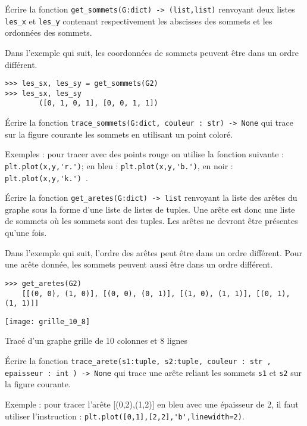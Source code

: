 \begin{question}Écrire la fonction \lstinline{get_sommets(G:dict) -> (list,list)} renvoyant deux listes \lstinline{les_x} et \lstinline{les_y} contenant respectivement les abscisses des sommets et les ordonnées des sommets.
\end{question}


\begin{exemple}
Dans l'exemple qui suit, les coordonnées de sommets peuvent être dans un ordre différent. 
\begin{lstlisting}
>>> les_sx, les_sy = get_sommets(G2)
>>> les_sx, les_sy
        ([0, 1, 0, 1], [0, 0, 1, 1])
\end{lstlisting}
\end{exemple}


\begin{question}
Écrire la fonction \lstinline{trace_sommets(G:dict, couleur : str) -> None} qui trace sur la figure courante les sommets en utilisant un point coloré.

Exemples : pour tracer avec des points rouge on utilise la fonction suivante : \lstinline{plt.plot(x,y,'r.')};  en bleu : \lstinline{plt.plot(x,y,'b.')}, en noir : \lstinline{plt.plot(x,y,'k.') }.
\end{question}

\begin{question}
Écrire la fonction \lstinline{get_aretes(G:dict) -> list} renvoyant la liste des arêtes du graphe sous la forme d'une liste de listes de tuples. Une arête est donc une liste de sommets où les sommets sont des tuples. Les arêtes ne devront être présentes qu'une fois.
\end{question}

\begin{exemple}
Dans l'exemple qui suit, l'ordre des arêtes peut être dans un ordre différent. Pour une arête donnée, les sommets peuvent aussi être dans un ordre différent.
\begin{lstlisting}
>>> get_aretes(G2)
	[[(0, 0), (1, 0)], [(0, 0), (0, 1)], [(1, 0), (1, 1)], [(0, 1), (1, 1)]]
\end{lstlisting}
\end{exemple}


\begin{marginfigure}\centering
\texttt{[image: grille\_10\_8]}
\caption{Tracé d'un graphe grille de 10 colonnes et 8 lignes}
\end{marginfigure}


\begin{question}
Écrire la fonction \lstinline{trace_arete(s1:tuple, s2:tuple, couleur : str , epaisseur : int ) -> None} qui trace une arête reliant les sommets \lstinline{s1} et \lstinline{s2} sur la figure courante. 

Exemple : pour tracer l'arête [(0,2),(1,2)] en bleu avec une épaisseur de 2, il faut utiliser l'instruction : \lstinline{plt.plot([0,1],[2,2],'b',linewidth=2)}.
\end{question}


